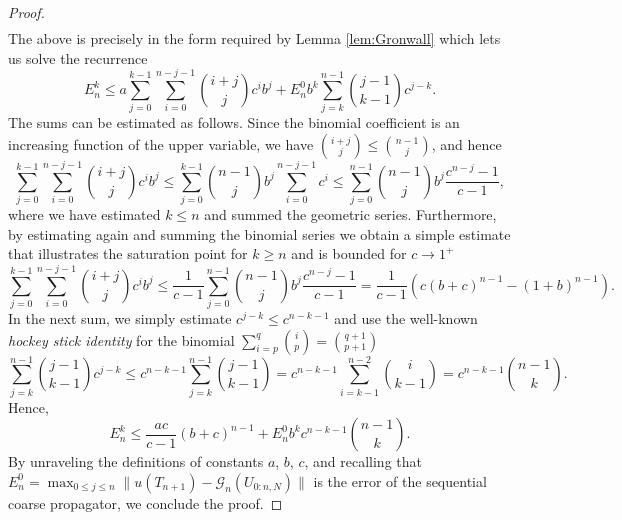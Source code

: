 \documentclass[12pt,a4paper]{article}
\begin{document}
\begin{proof}
\begin{equation}
\begin{split}
		\end{split}
	\end{equation}
	The above is precisely in the form required by Lemma \ref{lem:Gronwall} which lets us solve the recurrence
	\begin{equation}
		E^{k}_n \leq a \sum_{j=0}^{k-1} \sum_{i=0}^{n-j-1} \binom{i+j}{j} c^i b^j + E^0_n b^k \sum_{j=k}^{n-1} \binom{j-1}{k-1} c^{j-k}.
	\end{equation}
	The sums can be estimated as follows. Since the binomial coefficient is an increasing function of the upper variable, we have $\binom{i+j}{j} \leq \binom{n-1}{j}$, and hence
	\begin{equation}
		\sum_{j=0}^{k-1} \sum_{i=0}^{n-j-1} \binom{i+j}{j} c^i b^j \leq \sum_{j=0}^{k-1} \binom{n-1}{j} b^j \sum_{i=0}^{n-j-1} c^i \leq \sum_{j=0}^{n-1} \binom{n-1}{j} b^j \frac{c^{n-j}-1}{c-1},
	\end{equation}
	where we have estimated $k \leq n$ and summed the geometric series. Furthermore, by estimating again and summing the binomial series we obtain a simple estimate that illustrates the saturation point for $k\geq n$ and is bounded for $c\rightarrow 1^+$
	\begin{equation}\label{eqn:DoubleSumEst}
		\sum_{j=0}^{k-1} \sum_{i=0}^{n-j-1} \binom{i+j}{j} c^i b^j \leq \frac{1}{c-1}\sum_{j=0}^{n-1} \binom{n-1}{j} b^j \frac{c^{n-j} - 1}{c-1} = \frac{1}{c-1} \left(c(b+c)^{n-1} - (1+b)^{n-1}\right).
	\end{equation}
	In the next sum, we simply estimate $c^{j-k} \leq c^{n-k-1}$ and use the well-known \textit{hockey stick identity} for the binomial $\sum_{i=p}^q \binom{i}{p} = \binom{q+1}{p+1}$
	\begin{equation}\label{eqn:SingleSumEst}
		\sum_{j=k}^{n-1} \binom{j-1}{k-1} c^{j-k} \leq c^{n-k-1} \sum_{j=k}^{n-1} \binom{j-1}{k-1} = c^{n-k-1} \sum_{i=k-1}^{n-2} \binom{i}{k-1} = c^{n-k-1} \binom{n-1}{k}.
	\end{equation}
	Hence, 
	\begin{equation}
		E^{k}_n \leq \frac{ac}{c-1} (b+c)^{n-1} + E^0_n b^k c^{n-k-1} \binom{n-1}{k}.
	\end{equation}
	By unraveling the definitions of constants $a$, $b$, $c$, and recalling that $E^0_n = \max_{0\leq j\leq n} \|u(T_{n+1}) - \mathcal{G}_n(U_{0:n,N})\|$ is the error of the sequential coarse propagator, we conclude the proof. 
\end{proof}
\end{document}
